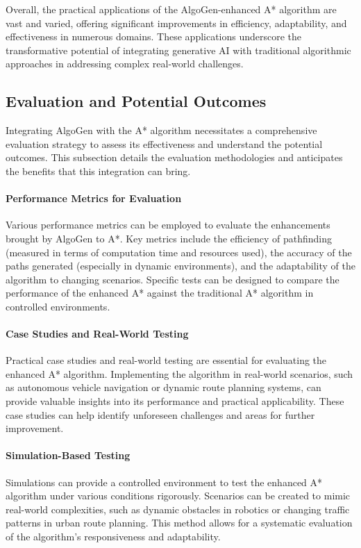 \documentclass{article}
\begin{document}
Overall, the practical applications of the AlgoGen-enhanced A* algorithm are vast and varied, offering significant improvements in efficiency, adaptability, and effectiveness in numerous domains. These applications underscore the transformative potential of integrating generative AI with traditional algorithmic approaches in addressing complex real-world challenges.



\subsection{Evaluation and Potential Outcomes}

Integrating AlgoGen with the A* algorithm necessitates a comprehensive evaluation strategy to assess its effectiveness and understand the potential outcomes. This subsection details the evaluation methodologies and anticipates the benefits that this integration can bring.

\paragraph{Performance Metrics for Evaluation}
Various performance metrics can be employed to evaluate the enhancements brought by AlgoGen to A*. Key metrics include the efficiency of pathfinding (measured in terms of computation time and resources used), the accuracy of the paths generated (especially in dynamic environments), and the adaptability of the algorithm to changing scenarios. Specific tests can be designed to compare the performance of the enhanced A* against the traditional A* algorithm in controlled environments.

\paragraph{Case Studies and Real-World Testing}
Practical case studies and real-world testing are essential for evaluating the enhanced A* algorithm. Implementing the algorithm in real-world scenarios, such as autonomous vehicle navigation or dynamic route planning systems, can provide valuable insights into its performance and practical applicability. These case studies can help identify unforeseen challenges and areas for further improvement.

\paragraph{Simulation-Based Testing}
Simulations can provide a controlled environment to test the enhanced A* algorithm under various conditions rigorously. Scenarios can be created to mimic real-world complexities, such as dynamic obstacles in robotics or changing traffic patterns in urban route planning. This method allows for a systematic evaluation of the algorithm's responsiveness and adaptability.
\end{document}
